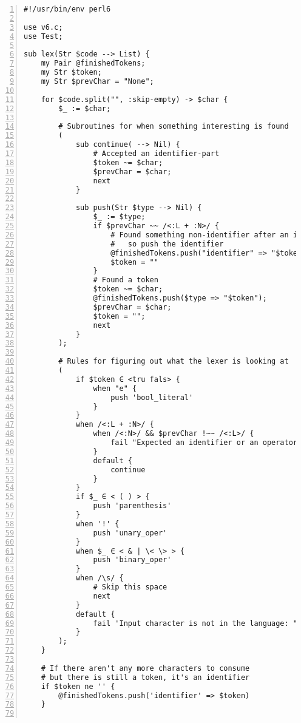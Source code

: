 \documentclass[17pt,english]{extarticle}
\begin{document}
\texttt{}
\begin{lstlisting}[numbers=left,basicstyle={\scriptsize\ttfamily},extendedchars=true]
#!/usr/bin/env perl6

use v6.c;
use Test;

sub lex(Str $code --> List) {
    my Pair @finishedTokens;
    my Str $token;
    my Str $prevChar = "None";

    for $code.split("", :skip-empty) -> $char {
        $_ := $char;

        # Subroutines for when something interesting is found
        (
            sub continue( --> Nil) {
                # Accepted an identifier-part
                $token ~= $char;
                $prevChar = $char;
                next
            }

            sub push(Str $type --> Nil) {
                $_ := $type;
                if $prevChar ~~ /<:L + :N>/ {
                    # Found something non-identifier after an identifier,
                    #   so push the identifier
                    @finishedTokens.push("identifier" => "$token");
                    $token = ""
                }
                # Found a token
                $token ~= $char;
                @finishedTokens.push($type => "$token");
                $prevChar = $char;
                $token = "";
                next
            }
        );

        # Rules for figuring out what the lexer is looking at
        (
            if $token ∈ <tru fals> {
                when "e" {
                    push 'bool_literal'
                }
            }
            when /<:L + :N>/ {
                when /<:N>/ && $prevChar !~~ /<:L>/ {
                    fail "Expected an identifier or an operator."
                }
                default {
                    continue
                }
            }
            if $_ ∈ < ( ) > {
                push 'parenthesis'
            }
            when '!' {
                push 'unary_oper'
            }
            when $_ ∈ < & | \< \> > {
                push 'binary_oper'
            }
            when /\s/ {
                # Skip this space
                next
            }
            default {
                fail 'Input character is not in the language: "' ~ $char ~ '"'
            }
        );
    }

    # If there aren't any more characters to consume
    # but there is still a token, it's an identifier
    if $token ne '' {
        @finishedTokens.push('identifier' => $token)
    }


\end{lstlisting}
\end{document}
